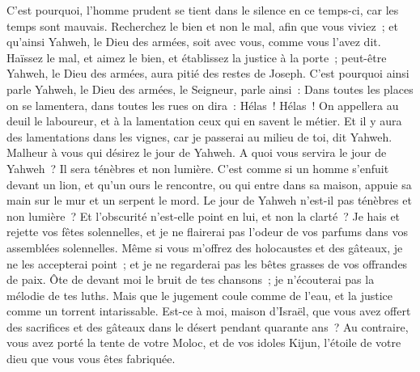 \begin{multicols}{2}
C'est pourquoi, l'homme prudent se tient dans le silence en ce temps-ci, car les temps sont mauvais.
Recherchez le bien et non le mal, afin que vous viviez~; et qu'ainsi Yahweh, le Dieu des armées, soit avec vous, comme vous l'avez dit.
Haïssez le mal, et aimez le bien, et établissez la justice à la porte~; peut-être Yahweh, le Dieu des armées, aura pitié des restes de Joseph.
C'est pourquoi ainsi parle Yahweh, le Dieu des armées, le Seigneur, parle ainsi~: Dans toutes les places on se lamentera, dans toutes les rues on dira~: Hélas~! Hélas~! On appellera au deuil le laboureur, et à la lamentation ceux qui en savent le métier.
Et il y aura des lamentations dans les vignes, car je passerai au milieu de toi, dit Yahweh.
Malheur à vous qui désirez le jour de Yahweh. A quoi vous servira le jour de Yahweh~? Il sera ténèbres et non lumière.
C'est comme si un homme s'enfuit devant un lion, et qu'un ours le rencontre, ou qui entre dans sa maison, appuie sa main sur le mur et un serpent le mord.
Le jour de Yahweh n'est-il pas ténèbres et non lumière~? Et l'obscurité n'est-elle point en lui, et non la clarté~?
Je hais et rejette vos fêtes solennelles, et je ne flairerai pas l'odeur de vos parfums dans vos assemblées solennelles.
Même si vous m'offrez des holocaustes et des gâteaux, je ne les accepterai point~; et je ne regarderai pas les bêtes grasses de vos offrandes de paix.
Ôte de devant moi le bruit de tes chansons~; je n'écouterai pas la mélodie de tes luths.
Mais que le jugement coule comme de l'eau, et la justice comme un torrent intarissable.
Est-ce à moi, maison d'Israël, que vous avez offert des sacrifices et des gâteaux dans le désert pendant quarante ans~?
Au contraire, vous avez porté la tente de votre Moloc, et de vos idoles Kijun, l'étoile de votre dieu que vous vous êtes fabriquée.

\end{multicols}

